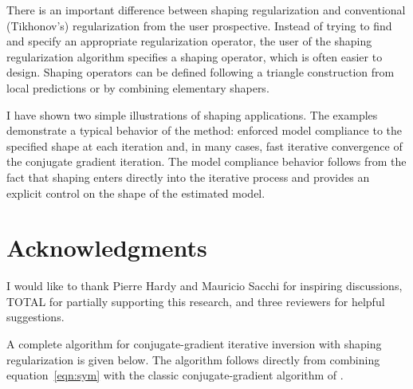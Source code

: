 There is an important difference between shaping regularization and
conventional (Ti\-kho\-nov's) regularization from the user prospective. Instead
of trying to find and specify an appropriate regularization operator, the user
of the shaping regularization algorithm specifies a shaping operator, which is
often easier to design. Shaping operators can be defined following a triangle
construction from local predictions or by combining elementary shapers.

I have shown two simple illustrations of shaping applications. The
examples demonstrate a typical behavior of the method: 
enforced model compliance to the specified shape at each
iteration and, in many cases, fast iterative convergence of the
conjugate gradient iteration. The model compliance
behavior follows from the fact that shaping enters directly into the
iterative process and provides an explicit control on the shape of the
estimated model.



\section{Acknowledgments}
I would like to thank Pierre Hardy and Mauricio Sacchi for inspiring
discussions, TOTAL for partially supporting this research, and three
  reviewers for helpful suggestions.





A complete algorithm for conjugate-gradient iterative inversion with
shaping regularization is given below. The algorithm follows directly
from combining equation~\ref{eqn:sym} with the classic
conjugate-gradient algorithm of \cite{hestenes}.

